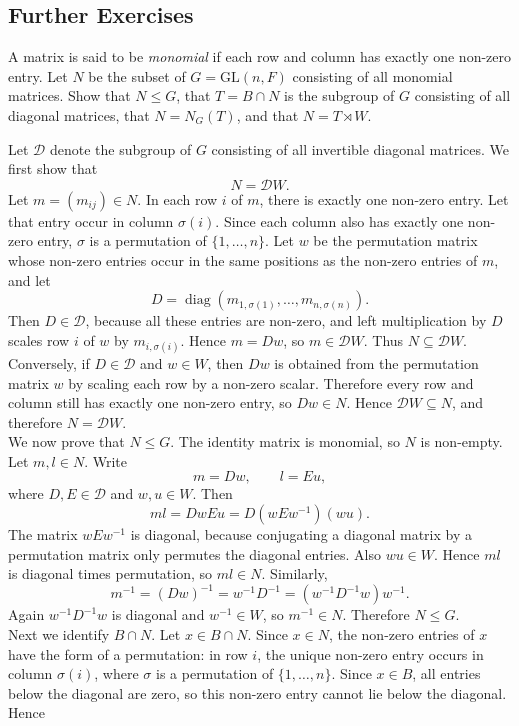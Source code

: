 \documentclass[../Odyssey_Project.tex]{subfiles}
\begin{document}
\subsection*{Further Exercises}

\begin{exercise}
\label{ex:4.7}
A matrix is said to be \emph{monomial} if each row and column has exactly one non-zero entry. Let $N$ be the subset of $G = \mathrm{GL}(n, F)$ consisting of all monomial matrices. Show that $N \leq G$, that $T = B \cap N$ is the subgroup of $G$ consisting of all diagonal matrices, that $N = N_G(T)$, and that $N = T \rtimes W$.
\end{exercise}
\begin{solution}
Let $\mathcal D$ denote the subgroup of $G$ consisting of all invertible diagonal matrices. We first show that
\[
    N=\mathcal D W.
\]
Let $m=(m_{ij})\in N$. In each row $i$ of $m$, there is exactly one non-zero entry. Let that entry occur in column $\sigma(i)$. Since each column also has exactly one non-zero entry, $\sigma$ is a permutation of $\{1,\ldots,n\}$. Let $w$ be the permutation matrix whose non-zero entries occur in the same positions as the non-zero entries of $m$, and let
\[
    D=\operatorname{diag}(m_{1,\sigma(1)},\ldots,m_{n,\sigma(n)}).
\]
Then $D\in \mathcal D$, because all these entries are non-zero, and left multiplication by $D$ scales row $i$ of $w$ by $m_{i,\sigma(i)}$. Hence $m=Dw$, so $m\in \mathcal D W$. Thus $N\subseteq \mathcal D W$. Conversely, if $D\in\mathcal D$ and $w\in W$, then $Dw$ is obtained from the permutation matrix $w$ by scaling each row by a non-zero scalar. Therefore every row and column still has exactly one non-zero entry, so $Dw\in N$. Hence $\mathcal D W\subseteq N$, and therefore $N=\mathcal D W$.\\
We now prove that $N\leq G$. The identity matrix is monomial, so $N$ is non-empty. Let $m,l\in N$. Write
\[
    m=Dw,\qquad l=Eu,
\]
where $D,E\in\mathcal D$ and $w,u\in W$. Then
\[
    ml
    =
    DwEu
    =
    D(wEw^{-1})(wu).
\]
The matrix $wEw^{-1}$ is diagonal, because conjugating a diagonal matrix by a permutation matrix only permutes the diagonal entries. Also $wu\in W$. Hence $ml$ is diagonal times permutation, so $ml\in N$. Similarly,
\[
    m^{-1}
    =
    (Dw)^{-1}
    =
    w^{-1}D^{-1}
    =
    (w^{-1}D^{-1}w)w^{-1}.
\]
Again $w^{-1}D^{-1}w$ is diagonal and $w^{-1}\in W$, so $m^{-1}\in N$. Therefore $N\leq G$.\\
Next we identify $B\cap N$. Let $x\in B\cap N$. Since $x\in N$, the non-zero entries of $x$ have the form of a permutation: in row $i$, the unique non-zero entry occurs in column $\sigma(i)$, where $\sigma$ is a permutation of $\{1,\ldots,n\}$. Since $x\in B$, all entries below the diagonal are zero, so this non-zero entry cannot lie below the diagonal. Hence

\end{solution}
\end{document}

